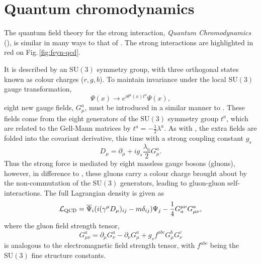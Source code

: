 \section{Quantum chromodynamics}
\label{sec:QCD}

The quantum field theory for the strong interaction, \textit{Quantum Chromodynamics} (\QCD{}), is similar in many ways to that of \QED{}.
The strong interactions are highlighted in red on Fig.\,\ref{fig:feyn-qcd}.

It is described by an $\mathrm{SU(3)}$ symmetry group, with three orthogonal states known as colour charges ($r,g,b$).
To maintain invariance under the local $\mathrm{SU(3)}$ gauge transformation,
\begin{equation}
\Psi(x) \to e^{i\theta^{a}(x)t^{a}}\Psi(x),
\end{equation}
eight new gauge fields, $G_{\mu}^{a}$, must be introduced in a similar manner to \QED{}.
These fields come from the eight generators of the $\mathrm{SU(3)}$ symmetry group $t^{a}$, which are related to the Gell-Mann matrices by $t^{a}=-\frac{1}{2}\lambda^{a}$.
As with \QED{}, the extra fields are folded into the covariant derivative, this time with a strong coupling constant $g_{s}$
\begin{equation}
D_{\mu} = \partial_{\mu}+ig_{s}\frac{\lambda_{a}}{2}G_{\mu}^{a}.
\end{equation}
Thus the strong force is mediated by eight massless gauge bosons (gluons), however, in difference to \QED{}, these gluons carry a colour charge brought about by the non-commutation of the $\mathrm{SU(3)}$ generators, leading to gluon-gluon self-interactions.
The full \QCD{} Lagrangian density is given as
\begin{equation}
\mathcal{L}_{\mathrm{QCD}}=\overline{\Psi}_{i}(i(\gamma^{\mu}D_{\mu})_{ij}-m\delta_{ij})\Psi_{j} - \frac{1}{4}G^{\mu \nu}_{a}G^{a}_{\mu \nu},
\end{equation}
where the gluon field strength tensor, 
\begin{equation}
	G_{\mu \nu}^{a}=\partial_{\mu}G_{\nu}^{a} - \partial_{\nu}G_{\mu}^{a} + g_{s}f^{abc}G_{\mu}^{b}G_{\nu }^{c}
\end{equation}
is analogous to the electromagnetic field strength tensor, with $f^{abc}$ being the $\mathrm{SU(3)}$ fine structure constants.

